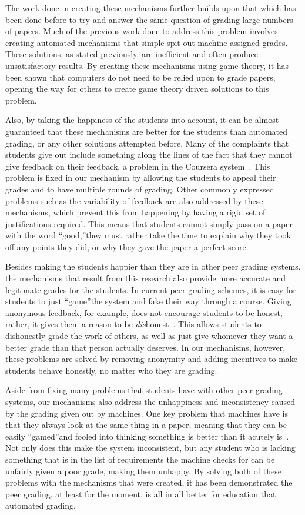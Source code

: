 \documentclass[12pt, Arial]{article}
\begin{document}
The work done in creating these mechanisms further builds upon that which has been done before to try and answer the same question of grading large numbers of papers. Much of the previous work done to address this problem involves creating automated mechanisms that simple spit out machine-assigned grades. These solutions, as stated previously, are inefficient and often produce unsatisfactory results. By creating these mechanisms using game theory, it has been shown that computers do not need to be relied upon to grade papers, opening the way for others to create game theory driven solutions to this problem.

Also, by taking the happiness of the students into account, it can be almost guaranteed that these mechanisms are better for the students than automated grading, or any other solutions attempted before. Many of the complaints that students give out include something along the lines of the fact that they cannot give feedback on their feedback, a problem in the Coursera system~\cite{howaccurateispeergrading}. This problem is fixed in our mechanism by allowing the students to appeal their grades and to have multiple rounds of grading. Other commonly expressed problems such as the variability of feedback are also addressed by these mechanisms, which prevent this from happening by having a rigid set of justifications required. This means that students cannot simply pass on a paper with the word ``good,''they must rather take the time to explain why they took off any points they did, or why they gave the paper a perfect score.

Besides making the students happier than they are in other peer grading systems, the mechanisms that result from this research also provide more accurate and legitimate grades for the students. In current peer grading schemes, it is easy for students to just ``game''the system and fake their way through a course. Giving anonymous feedback, for example, does not encourage students to be honest, rather, it gives them a reason to be \emph{dis}honest~\cite{howaccurateispeergrading}. This allows students to dishonestly grade the work of others, as well as just give whomever they want a better grade than that person actually deserves. In our mechanisms, however, these problems are solved by removing anonymity and adding incentives to make students behave honestly, no matter who they are grading.

Aside from fixing many problems that students have with other peer grading systems, our mechanisms also address the unhappiness and inconsistency caused by the grading given out by machines. One key problem that machines have is that they always look at the same thing in a paper, meaning that they can be easily ``gamed''and fooled into thinking something is better than it acutely is~\cite{robogradingproblems}. Not only does this make the system inconsistent, but any student who is lacking something that is in the list of requirements the machine checks for can be unfairly given a poor grade, making them unhappy. By solving both of these problems with the mechanisms that were created, it has been demonstrated the peer grading, at least for the moment, is all in all better for education that automated grading.
\end{document}
